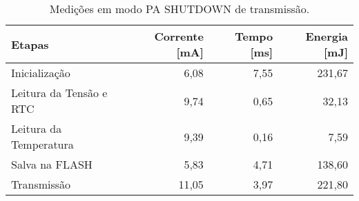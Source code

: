 \begin{table}
\centering
\caption{Medições em modo PA SHUTDOWN de transmissão.}
\label{tab:PA_SHUTDOWN}
\begin{tabular}{lrrr}
\toprule
                 Etapas &  Corrente [mA] &  Tempo [ms] &  Energia [mJ] \\
\midrule
          Inicialização &           6,08 &        7,55 &        231,67 \\
Leitura da Tensão e RTC &           9,74 &        0,65 &         32,13 \\
 Leitura da Temperatura &           9,39 &        0,16 &          7,59 \\
         Salva na FLASH &           5,83 &        4,71 &        138,60 \\
            Transmissão &          11,05 &        3,97 &        221,80 \\
\bottomrule
\end{tabular}
\end{table}
